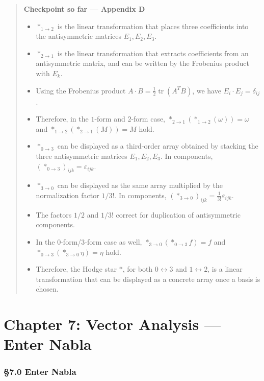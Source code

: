 \documentclass[a4paper,12pt,openany]{book}
\begin{document}
\begin{quote}
\textbf{Checkpoint so far — Appendix D}

\begin{itemize}
\item
  \(\ast_{1\to2}\) is the linear transformation that places three
  coefficients into the antisymmetric matrices \(E_1,E_2,E_3\).
\item
  \(\ast_{2\to1}\) is the linear transformation that extracts
  coefficients from an antisymmetric matrix, and can be written by the
  Frobenius product with \(E_k\).
\item
  Using the Frobenius product
  \(A\cdot B=\frac{1}{2}\operatorname{tr}(A^TB)\), we have
  \(E_i\cdot E_j=\delta_{ij}\).
\item
  Therefore, in the \(1\)-form and \(2\)-form case,
  \(\ast_{2\to1}(\ast_{1\to2}(\omega))=\omega\) and
  \(\ast_{1\to2}(\ast_{2\to1}(M))=M\) hold.
\item
  \(\ast_{0\to3}\) can be displayed as a third-order array obtained by
  stacking the three antisymmetric matrices \(E_1,E_2,E_3\). In
  components, \((\ast_{0\to3})_{ijk}=\varepsilon_{ijk}\).
\item
  \(\ast_{3\to0}\) can be displayed as the same array multiplied by the
  normalization factor \(1/3!\). In components,
  \((\ast_{3\to0})_{ijk}=\frac{1}{3!}\varepsilon_{ijk}\).
\item
  The factors \(1/2\) and \(1/3!\) correct for duplication of
  antisymmetric components.
\item
  In the \(0\)-form/\(3\)-form case as well,
  \(\ast_{3\to0}(\ast_{0\to3}f)=f\) and
  \(\ast_{0\to3}(\ast_{3\to0}\eta)=\eta\) hold.
\item
  Therefore, the Hodge star \(\ast\), for both \(0\leftrightarrow3\) and
  \(1\leftrightarrow2\), is a linear transformation that can be
  displayed as a concrete array once a basis is chosen.
\end{itemize}
\end{quote}

\newpage

\hypertarget{chapter-7-vector-analysis-enter-nabla}{%
\chapter{Chapter 7: Vector Analysis — Enter
Nabla}\label{chapter-7-vector-analysis-enter-nabla}}

\hypertarget{enter-nabla}{%
\subsection{§7.0 Enter Nabla}\label{enter-nabla}}
\end{document}
